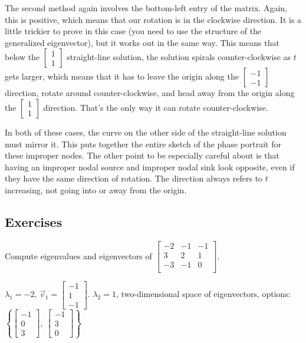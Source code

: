 The second method again involves the bottom-left entry of the matrix. Again, this is positive, which means that our rotation is in the clockwise direction. It is a little trickier to prove in this case (you need to use the structure of the generalized eigenvector), but it works out in the same way. This means that below the $\left[\begin{smallmatrix} 1 \\ 1 \end{smallmatrix}\right]$ straight-line solution, the solution spirals counter-clockwise as $t$ gets larger, which means that it has to leave the origin along the $\left[\begin{smallmatrix} -1 \\ -1 \end{smallmatrix}\right]$ direction, rotate around counter-clockwise, and head away from the origin along the $\left[\begin{smallmatrix} 1 \\ 1 \end{smallmatrix}\right]$ direction. That's the only way it can rotate counter-clockwise. 

In both of these cases, the curve on the other side of the straight-line solution must mirror it. This puts together the entire sketch of the phase portrait for these improper nodes. The other point to be especially careful about is that having an improper nodal source and improper nodal sink look opposite, even if they have the same direction of rotation. The direction always refers to $t$ increasing, not going into or away from the origin. 

\subsection{Exercises}

\begin{exercise}
Compute eigenvalues and eigenvectors of
$\left[ \begin{smallmatrix}
-2 & -1 & -1 \\
3 & 2 & 1 \\
-3 & -1 & 0 \\
\end{smallmatrix} \right]$.
\end{exercise}
\comboSol{%
}
{%
$\lambda_1 = -2$, $\vec{v}_1 = \left[\begin{smallmatrix} -1 \\ 1 \\ -1 \end{smallmatrix}\right]$. $\lambda_2 = 1$, two-dimensional space of eigenvectors, options: $\left\{ \left[\begin{smallmatrix} -1 \\ 0 \\ 3 \end{smallmatrix}\right],\ \left[\begin{smallmatrix} -1 \\ 3 \\ 0 \end{smallmatrix}\right]\right\}$
}


